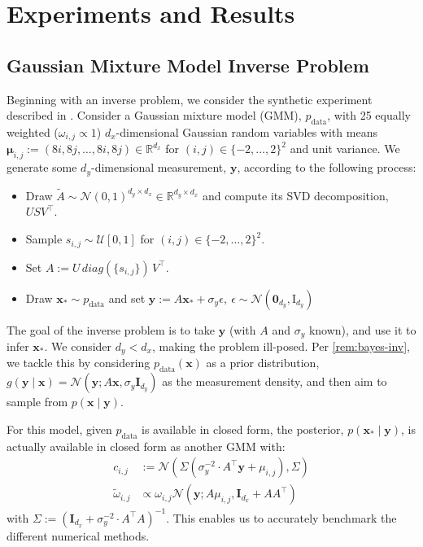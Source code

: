 \chapter{Experiments and Results} \label{chap:experiments}

\section{Gaussian Mixture Model Inverse Problem} \label{sec:gmm}

Beginning with an inverse problem, we consider the synthetic experiment described in
\textcite{cardosoMonteCarloGuided2023,boysTweedieMomentProjected2023}.
Consider a Gaussian mixture model (GMM), $p_{\text{data}}$, with 25 equally weighted
($\omega_{i,j} \propto 1$) $d_x$-dimensional Gaussian random variables with means
$\mathbf{\mu}_{i,j} := (8i, 8j, \dots, 8i, 8j) \in \mathbb{R}^{d_x}$
for $(i, j)\in \{-2, \ldots, 2\}^2$ and unit variance.
We generate some $d_y$-dimensional measurement, $\mathbf{y}$, according to the following process:
\begin{itemize}
    \item Draw $\tilde{A} \sim \mathcal{N}(0, 1)^{d_y \times d_x} \in \mathbb{R}^{d_y \times d_x}$
    and compute its SVD decomposition, $USV^\top$.
    \item Sample $s_{i,j} \sim \mathcal{U}[0,1]$ for $(i,j) \in \{-2, \dots, 2\}^2$.
    \item Set $A := U\, diag(\{s_{i,j}\})\, V^\top$.
    \item Draw $\mathbf{x}_* \sim p_{\text{data}}$ and set $\mathbf{y} := A\mathbf{x}_* + \sigma_y\epsilon,\ \epsilon \sim \mathcal{N}(\mathbf{0}_{d_y}, \mathrm{I}_{d_y})$
\end{itemize}

The goal of the inverse problem is to take $\mathbf{y}$ (with $A$ and $\sigma_y$ known), and use
it to infer $\mathbf{x}_*$. We consider $d_y < d_x$, making the problem ill-posed. Per
\autoref{rem:bayes-inv}, we tackle this by considering $p_{\text{data}}(\mathbf{x})$ as a prior
distribution,
$g(\mathbf{y} \mid \mathbf{x}) = \mathcal{N}(\mathbf{y}; A\mathbf{x}, \sigma_y\mathbf{I}_{d_y})$
as the measurement density, and then aim to sample from $p(\mathbf{x} \mid \mathbf{y})$.

For this model, given $p_{\text{data}}$ is available in closed form, the posterior,
$p(\mathbf{x}_* \mid \mathbf{y})$, is actually available in closed form as another GMM with:
\begin{align*}
    c_{i,j} &:= \mathcal{N}\left(\Sigma\left(\sigma_y^{-2}\cdot A^\top\mathbf{y} + \mu_{i,j}\right), \Sigma\right) \\
    \tilde{\omega}_{i,j} &\propto \omega_{i,j} \mathcal{N}\left(\mathbf{y}; A\mu_{i,j}, \mathbf{I}_{d_x} + AA^\top \right)
\end{align*}
with $\Sigma := \left(\mathbf{I}_{d_x} + \sigma_y^{-2}\cdot A^\top A\right)^{-1}$. This enables
us to accurately benchmark the different numerical methods.


